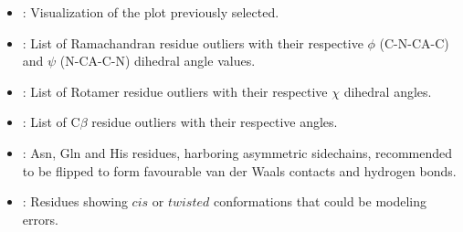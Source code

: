 \begin{itemize}
\begin{itemize}
\begin{itemize}
\begin{itemize}
          \item {}: Visualization of the plot previously selected.
          \item {}: List of Ramachandran residue outliers with their respective $\phi$ (C-N-CA-C) and $\psi$ (N-CA-C-N) dihedral angle values.
          \item {}: List of Rotamer residue outliers with their respective $\chi$ dihedral angles.
          \item {}: List of C{$\beta$} residue outliers with their respective angles.
          \item {}: Asn, Gln and His residues, harboring asymmetric sidechains, recommended to be flipped to form favourable van der Waals contacts and hydrogen bonds.
          \item {}: Residues showing $cis$ or $twisted$ conformations that could be modeling errors.
         \end{itemize}


\end{itemize}
\end{itemize}
\end{itemize}
